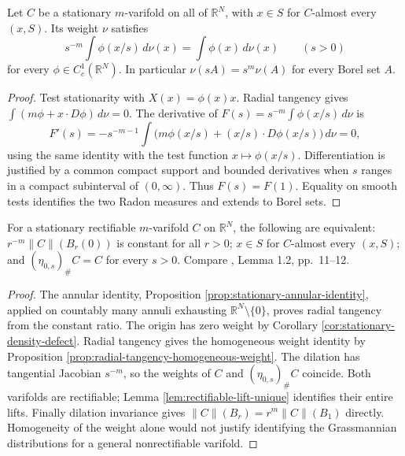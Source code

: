 \begin{proposition}\label{prop:radial-tangency-homogeneous-weight}
Let $C$ be a stationary $m$-varifold on all of $\mathbb R^N$, with $x\in S$ for $C$-almost every $(x,S)$. Its weight $\nu$ satisfies
\[
 s^{-m}\int\phi(x/s)\,d\nu(x)=\int\phi(x)\,d\nu(x)\qquad(s>0)
\]
for every $\phi\in C_c^1(\mathbb R^N)$. In particular $\nu(sA)=s^m\nu(A)$ for every Borel set $A$.
\end{proposition}
\begin{proof}
Test stationarity with $X(x)=\phi(x)x$. Radial tangency gives
$\int(m\phi+x\cdot D\phi)\,d\nu=0$.
The derivative of $F(s)=s^{-m}\int\phi(x/s)\,d\nu$ is
\[
 F'(s)=-s^{-m-1}\int\bigl(m\phi(x/s)+(x/s)\cdot D\phi(x/s)\bigr)\,d\nu=0,
\]
using the same identity with the test function $x\mapsto\phi(x/s)$. Differentiation is justified by a common compact support and bounded derivatives when $s$ ranges in a compact subinterval of $(0,\infty)$. Thus $F(s)=F(1)$. Equality on smooth tests identifies the two Radon measures and extends to Borel sets.
\end{proof}

\begin{theorem}\label{thm:constant-ratio-cone}
For a stationary rectifiable $m$-varifold $C$ on $\mathbb R^N$, the following are equivalent: $r^{-m}\|C\|(B_r(0))$ is constant for all $r>0$; $x\in S$ for $C$-almost every $(x,S)$; and $(\eta_{0,s})_\#C=C$ for every $s>0$. Compare \cite{Minter}, Lemma 1.2, pp.~11--12.
\end{theorem}
\begin{proof}
The annular identity, Proposition \ref{prop:stationary-annular-identity}, applied on countably many annuli exhausting $\mathbb R^N\setminus\{0\}$, proves radial tangency from the constant ratio. The origin has zero weight by Corollary \ref{cor:stationary-density-defect}. Radial tangency gives the homogeneous weight identity by Proposition \ref{prop:radial-tangency-homogeneous-weight}. The dilation has tangential Jacobian $s^{-m}$, so the weights of $C$ and $(\eta_{0,s})_\#C$ coincide. Both varifolds are rectifiable; Lemma \ref{lem:rectifiable-lift-unique} identifies their entire lifts. Finally dilation invariance gives $\|C\|(B_r)=r^m\|C\|(B_1)$ directly. Homogeneity of the weight alone would not justify identifying the Grassmannian distributions for a general nonrectifiable varifold.
\end{proof}

